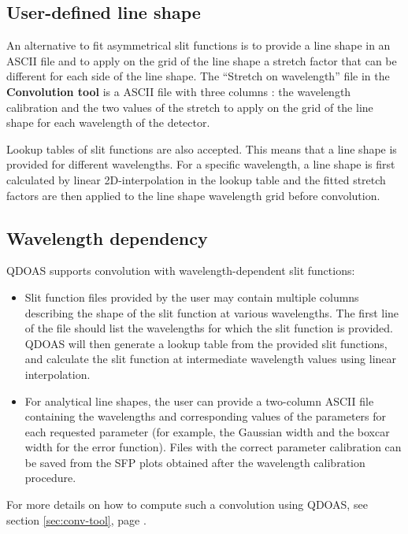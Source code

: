 \subsection{User-defined line shape}\label{sec:userdef-line-shap}

An alternative to fit asymmetrical slit functions is to provide a line shape in an ASCII file and to apply on the grid of the line shape a stretch factor that can be different for each side of the line shape.
The ``Stretch on wavelength'' file in the \textbf{Convolution tool} is a ASCII file with three columns : the wavelength calibration and the two values of the stretch to apply on the grid of the line shape for each wavelength of the detector.

Lookup tables of slit functions are also accepted.  This means that a
line shape is provided for different wavelengths.  For a specific
wavelength, a line shape is first calculated by linear
2D-interpolation in the lookup table and the fitted stretch factors
are then applied to the line shape wavelength grid before convolution.

\subsection{Wavelength dependency}
QDOAS supports convolution with wavelength-dependent slit functions:
\begin{itemize}
\item Slit function files provided by the user may contain multiple
  columns describing the shape of the slit function at various
  wavelengths.  The first line of the file should list the wavelengths
  for which the slit function is provided.  QDOAS will then generate a
  lookup table from the provided slit functions, and calculate the
  slit function at intermediate wavelength values using linear
  interpolation.
\item For analytical line shapes, the user can provide a two-column
  ASCII file containing the wavelengths and corresponding values of
  the parameters for each requested parameter (for example, the
  Gaussian width and the boxcar width for the error function).  Files
  with the correct parameter calibration can be saved from the SFP
  plots obtained after the wavelength calibration procedure.
\end{itemize}
For more details on how to compute such a convolution using QDOAS, see
section \ref{sec:conv-tool}, page \pageref{sec:slit-function-page}.

